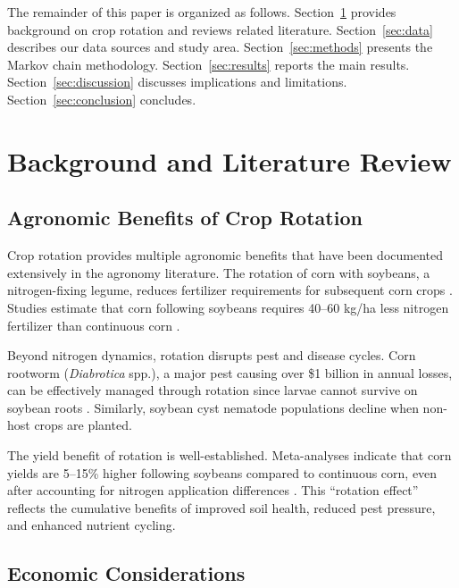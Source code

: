 \documentclass[12pt, a4paper]{article}
\begin{document}
The remainder of this paper is organized as follows. Section~\ref{sec:background} provides background on crop rotation and reviews related literature. Section~\ref{sec:data} describes our data sources and study area. Section~\ref{sec:methods} presents the Markov chain methodology. Section~\ref{sec:results} reports the main results. Section~\ref{sec:discussion} discusses implications and limitations. Section~\ref{sec:conclusion} concludes.


\section{Background and Literature Review}
\label{sec:background}

\subsection{Agronomic Benefits of Crop Rotation}

Crop rotation provides multiple agronomic benefits that have been documented extensively in the agronomy literature. The rotation of corn with soybeans, a nitrogen-fixing legume, reduces fertilizer requirements for subsequent corn crops \citep{peoples1995biological}. Studies estimate that corn following soybeans requires 40--60 kg/ha less nitrogen fertilizer than continuous corn \citep{gentry2013nitrogen}.

Beyond nitrogen dynamics, rotation disrupts pest and disease cycles. Corn rootworm (\textit{Diabrotica} spp.), a major pest causing over \$1 billion in annual losses, can be effectively managed through rotation since larvae cannot survive on soybean roots \citep{gray2009adaptation}. Similarly, soybean cyst nematode populations decline when non-host crops are planted.

The yield benefit of rotation is well-established. Meta-analyses indicate that corn yields are 5--15\% higher following soybeans compared to continuous corn, even after accounting for nitrogen application differences \citep{seifert2017yield}. This ``rotation effect'' reflects the cumulative benefits of improved soil health, reduced pest pressure, and enhanced nutrient cycling.

\subsection{Economic Considerations}
\end{document}
